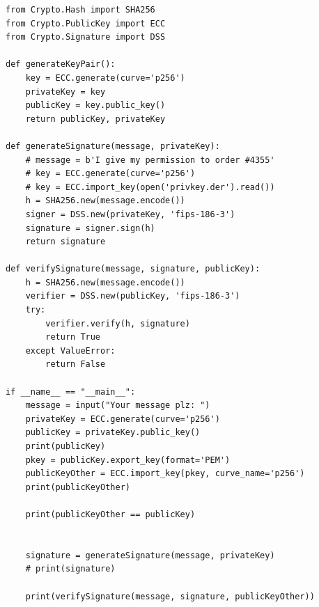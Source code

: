 \begin{lstlisting}[style=mypython, caption={DSS.py}, label={code:A-2-b-DSS}]
from Crypto.Hash import SHA256
from Crypto.PublicKey import ECC
from Crypto.Signature import DSS

def generateKeyPair():
    key = ECC.generate(curve='p256')
    privateKey = key
    publicKey = key.public_key()
    return publicKey, privateKey

def generateSignature(message, privateKey):
    # message = b'I give my permission to order #4355'
    # key = ECC.generate(curve='p256')
    # key = ECC.import_key(open('privkey.der').read())
    h = SHA256.new(message.encode())
    signer = DSS.new(privateKey, 'fips-186-3')
    signature = signer.sign(h)
    return signature

def verifySignature(message, signature, publicKey):
    h = SHA256.new(message.encode())
    verifier = DSS.new(publicKey, 'fips-186-3')
    try:
        verifier.verify(h, signature)
        return True
    except ValueError:
        return False

if __name__ == "__main__":
    message = input("Your message plz: ")
    privateKey = ECC.generate(curve='p256')
    publicKey = privateKey.public_key()
    print(publicKey)
    pkey = publicKey.export_key(format='PEM')
    publicKeyOther = ECC.import_key(pkey, curve_name='p256')
    print(publicKeyOther)

    print(publicKeyOther == publicKey)


    signature = generateSignature(message, privateKey)
    # print(signature)

    print(verifySignature(message, signature, publicKeyOther))
\end{lstlisting}

